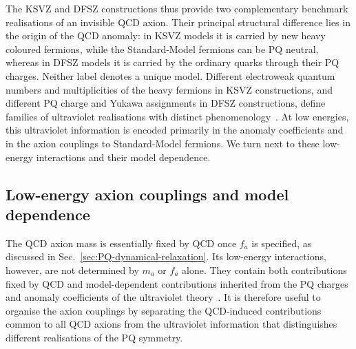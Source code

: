 \documentclass[review]{elsarticle}
\numberwithin{equation}{section}
\numberwithin{table}{section}
\numberwithin{figure}{section}
\begin{document}
The KSVZ and DFSZ constructions thus provide two complementary benchmark realisations of an invisible QCD axion. Their principal structural difference lies in the origin of the QCD anomaly: in KSVZ models it is carried by new heavy coloured fermions, while the Standard-Model fermions can be PQ neutral, whereas in DFSZ models it is carried by the ordinary quarks through their PQ charges. Neither label denotes a unique model. Different electroweak quantum numbers and multiplicities of the heavy fermions in KSVZ constructions, and different PQ charge and Yukawa assignments in DFSZ constructions, define families of ultraviolet realisations with distinct phenomenology~\cite{Kim:2008hd,DiLuzio:2020wdo}. At low energies, this ultraviolet information is encoded primarily in the anomaly coefficients and in the axion couplings to Standard-Model fermions. We turn next to these low-energy interactions and their model dependence.

\subsection{Low-energy axion couplings and model dependence}
\label{sec:axion-low-energy-couplings}

The QCD axion mass is essentially fixed by QCD once $f_a$ is specified, as discussed in Sec.~\ref{sec:PQ-dynamical-relaxation}. Its low-energy interactions, however, are not determined by $m_a$ or $f_a$ alone. They contain both contributions fixed by QCD and model-dependent contributions inherited from the PQ charges and anomaly coefficients of the ultraviolet theory~\cite{Srednicki:1985xd,Georgi:1986df,GrilliDiCortona:2015jxo,DiLuzio:2020wdo,Choi:2020rgn}. It is therefore useful to organise the axion couplings by separating the QCD-induced contributions common to all QCD axions from the ultraviolet information that distinguishes different realisations of the PQ symmetry.
\end{document}
